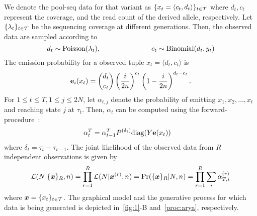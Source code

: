 
We denote the pool-seq data for that variant as $\{x_t = \langle
c_t,d_t \rangle\}_{t\in{\cal T}}$ where $d_t, c_t$ represent the coverage,
and the read count of the derived allele, respectively. Let
$\{\lambda_t\}_{t\in{\cal T}}$ be the sequencing coverage at different
generations. Then, the observed data are sampled according to
\begin{equation} d_t \sim \operatorname{Poisson}(\lambda_t), \hspace{1in} c_t \sim
\operatorname{Binomial}(d_t,y_t) 
\end{equation}
The emission probability for a observed tuple $x_t=\langle d_t,
c_t\rangle $ is 
\begin{equation} {\bf e}_{i}(x_t) = {d_t \choose c_t}
\left(\frac{i}{2n} \right)^{c_t}\left (1- \frac{i}{2n}
\right)^{d_t-c_t} .  
\end{equation}
For $1\le t\le T, 1\le j\le 2N$, let $\alpha_{t,j}$ denote the
probability of emitting $x_1,x_2,\ldots,x_t$ and reaching state $j$ at
$\tau_t$. Then, $\alpha_{t}$ can be computed using the
forward-procedure~\cite{durbin1998biological}:
\begin{align}
	\alpha_t^T&=\alpha_{t-1}^T P^{(\delta_t)}\text{diag}(Y{\mathbf e}(x_t))
	\label{eq:hmm}
\end{align}
where $\delta_t=\tau_t-\tau_{t-1}$. The joint likelihood of the
observed data from $R$ independent observations is given by
\begin{equation}
{\cal L}(N|\{\bm{x}\}_R, 
n)=\prod_{r=1}^R{\cal L}(N|\bm{x}^{(r)},n)=\operatorname{Pr}(\{\bm{x}\}_R|N,n) =	
	\prod_{r=1}^R \sum_i\alpha_{T,i}^{(r)}
	\label{eq:hmmlik}
\end{equation}
where $\bm{x}=\{x_t\}_{t\in {\cal T}}$. The graphical model and the generative 
process for which data is being generated is depicted in~\ref{fig:1}-B 
and~\ref{proc:arya}, respectively.


